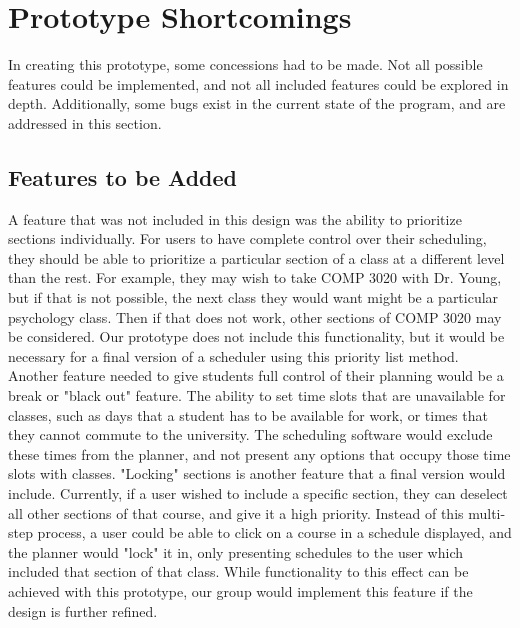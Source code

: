 \documentclass{article}
\begin{document}
\section{Prototype Shortcomings}
In creating this prototype, some concessions had to be made. Not all possible features could be implemented, and not all included features could be explored in depth. Additionally, some bugs exist in the current state of the program, and are addressed in this section.

\subsection{Features to be Added}

A feature that was not included in this design was the ability to prioritize sections individually. For users to have complete control over their scheduling, they should be able to prioritize a particular section of a class at a different level than the rest. For example, they may wish to take COMP 3020 with Dr. Young, but if that is not possible, the next class they would want might be a particular psychology class. Then if that does not work, other sections of COMP 3020 may be considered. Our prototype does not include this functionality, but it would be necessary for a final version of a  scheduler using this priority list method.
\newline
\newline
Another feature needed to give students full control of their planning would be a break or "black out" feature. The ability to set time slots that are unavailable for classes, such as days that a student has to be available for work, or times that they cannot commute to the university. The scheduling software would exclude these times from the planner, and not present any options that occupy those time slots with classes.
\newline
\newline
"Locking" sections is another feature that a final version would include. Currently, if a user wished to include a specific section, they can deselect all other sections of that course, and give it a high priority. Instead of this multi-step process, a user could be able to click on a course in a schedule displayed, and the planner would "lock" it in, only presenting schedules to the user which included that section of that class. While functionality to this effect can be achieved with this prototype, our group would implement this feature if the design is further refined.
\end{document}
